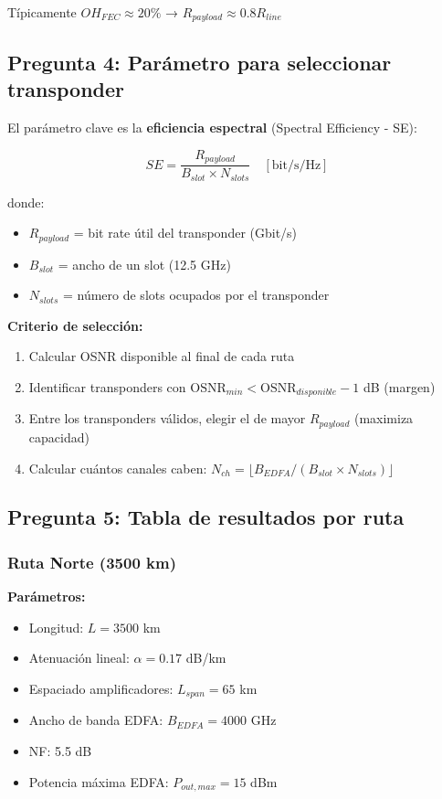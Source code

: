 \documentclass[12pt,a4paper]{extarticle}
\begin{document}
Típicamente $OH_{FEC} \approx 20\%$ → $R_{payload} \approx 0.8 R_{line}$

\subsection*{Pregunta 4: Parámetro para seleccionar transponder}

El parámetro clave es la \textbf{eficiencia espectral} (Spectral Efficiency - SE):

$$\boxed{SE = \frac{R_{payload}}{B_{slot} \times N_{slots}} \quad [\text{bit/s/Hz}]}$$

donde:
\begin{itemize}
    \item $R_{payload}$ = bit rate útil del transponder (Gbit/s)
    \item $B_{slot}$ = ancho de un slot (12.5 GHz)
    \item $N_{slots}$ = número de slots ocupados por el transponder
\end{itemize}

\textbf{Criterio de selección:}

\begin{enumerate}
    \item Calcular OSNR disponible al final de cada ruta
    \item Identificar transponders con $\text{OSNR}_{min} < \text{OSNR}_{disponible} - 1$ dB (margen)
    \item Entre los transponders válidos, elegir el de mayor $R_{payload}$ (maximiza capacidad)
    \item Calcular cuántos canales caben: $N_{ch} = \lfloor B_{EDFA} / (B_{slot} \times N_{slots}) \rfloor$
\end{enumerate}

\subsection*{Pregunta 5: Tabla de resultados por ruta}

\subsubsection*{Ruta Norte (3500 km)}

\textbf{Parámetros:}
\begin{itemize}
    \item Longitud: $L = 3500$ km
    \item Atenuación lineal: $\alpha = 0.17$ dB/km
    \item Espaciado amplificadores: $L_{span} = 65$ km
    \item Ancho de banda EDFA: $B_{EDFA} = 4000$ GHz
    \item NF: 5.5 dB
    \item Potencia máxima EDFA: $P_{out,max} = 15$ dBm
\end{itemize}
\end{document}
